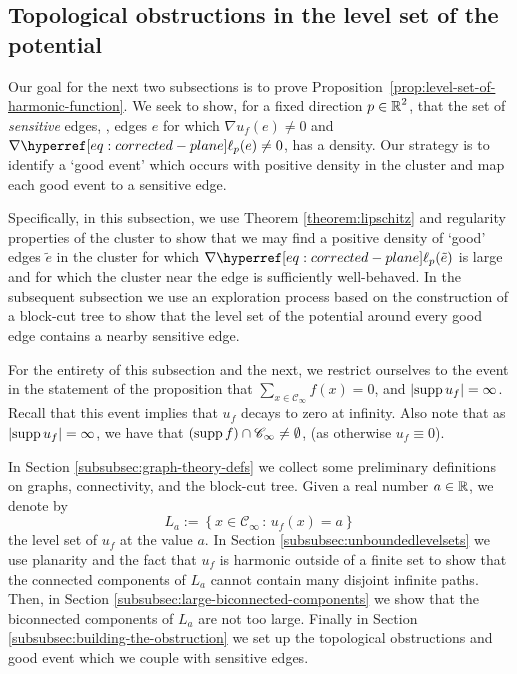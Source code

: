 \documentclass[12pt]{amsart}
\numberwithin{equation}{section}
\begin{document}
	\subsection{Topological obstructions in the level set of the potential} \label{subsec:obstruction}
	Our goal for the next two subsections is to prove Proposition~\ref{prop:level-set-of-harmonic-function}.  We seek to show, for a fixed direction $p \in \operatorname{\mathbb{R}}^2$, that the set of {\it sensitive} edges, \ie, edges $e$ for which $\nabla u_f(e) \neq 0$ and $\nabla \ellp{p}(e) \neq 0$, has a density. Our strategy is to identify a `good event' 
	which occurs with positive density in the cluster and map each good event to a sensitive edge.
	
	Specifically, in this subsection, we use Theorem \ref{theorem:lipschitz} and regularity properties of the cluster to 
	show that we may find a positive density of `good' edges $\tilde e$ in the cluster for which 
	$\nabla \ellp{p}(\tilde e)$ is large and for which the cluster near the edge is sufficiently well-behaved. 
	In the subsequent subsection we use an exploration process based on the construction of a block-cut tree to show that the level set of the potential around every good edge contains a nearby sensitive edge. 
	
	For the entirety of this subsection and the next, we restrict ourselves to the event in the statement of the proposition that  $\sum_{x \in \mathscr{C}_{\infty}} f(x) = 0$, and $|\mathrm{supp\,} u_f| = \infty$. Recall that this event implies that $u_f$ decays to zero at infinity. 
	Also note that as $|\mathrm{supp\,} u_f| = \infty$, we have that  $(\mathrm{supp\,} f ) \cap \mathscr{C}_\infty \neq \emptyset$, (as otherwise $u_f \equiv 0$).  
	
	
	In Section \ref{subsubsec:graph-theory-defs} we collect some preliminary definitions on graphs, connectivity, 
	and the block-cut tree. Given a real number $a \in \operatorname{\mathbb{R}}$, we denote by
	\begin{equation} \label{eq:level-set-def}
		L_a := \left\{ x \in \mathscr{C}_\infty \, : \, u_f(x) = a \right\}
	\end{equation}
	the level set of $u_f$ at the value $a$.  In Section \ref{subsubsec:unboundedlevelsets} we use planarity
	and the fact that $u_f$ is harmonic outside of a finite set to show that the connected components of $L_a$ cannot contain many disjoint infinite paths.  Then, in Section \ref{subsubsec:large-biconnected-components} 
	we show that the biconnected components of $L_a$ are not too large. Finally 
	in Section \ref{subsubsec:building-the-obstruction} we set up the topological obstructions and good event which
	we couple with sensitive edges. 
	
\end{document}
